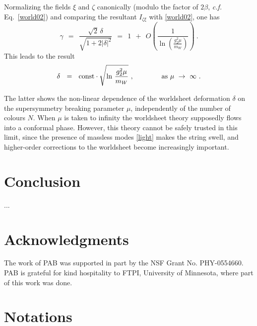 \documentclass[12pt]{article}
\def\beq{\begin{equation}}
\def\eeq{\end{equation}}
\begin{document}
	Normalizing the fields $ \xi $ and $ \zeta $ canonically (modulo the factor of $ 2\beta $, 
	{\it c.f.} Eq.~\eqref{world02}) and comparing the resultant $ I_{\zeta\xi} $ with \eqref{world02},
	one has
\beq
\label{gammaresult}
	\gamma ~~=~~ 
		\frac { \sqrt{2}\,\delta } { \sqrt{ 1 + 2 | \delta |^2 } } 
		~~=~~ 1 ~~+~~ O\left(\frac{1}{\ln\left(\frac{g_2^2\mu}{m_W}\right)}\right)~.
\eeq
	This leads to the result
\beq
\label{deltaresult}
	\delta~~=~~ 
	{\rm const} \cdot \sqrt{\ln\, \frac{g_2^2\mu}{m_W}}~,
	\qquad\qquad \text{as $\mu ~\to~ \infty$}~.
\eeq
	
	The latter shows the non-linear dependence of the worldsheet deformation $ \delta $ on the 
	supersymmetry breaking parameter $ \mu $, independently of the number of colours $ N $.
	When $ \mu $ is taken to infinity the worldsheet theory supposedly flows into a conformal phase.
	However, this theory cannot be safely trusted in this limit, since the presence
	of massless modes \eqref{light} makes the string swell, and higher-order corrections to
	the worldsheet become increasingly important. 

%
%
\section{Conclusion}
\setcounter{equation}{0}

...

\section*{Acknowledgments}

The work of PAB was supported in part by the NSF Grant No. PHY-0554660. PAB is grateful for kind
hospitality to FTPI, University of Minnesota, where part of this work was done. 

\appendix
%
%
\section{Notations}
\label{notations}
\setcounter{equation}{0}
\end{document}
